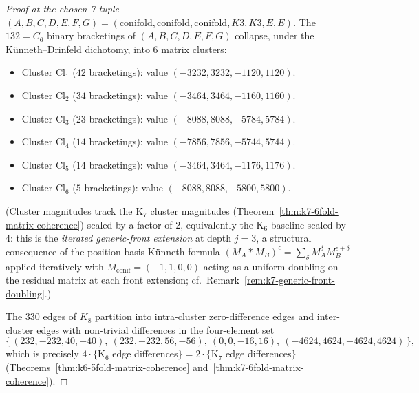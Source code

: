 \begin{proof}[Proof at the chosen 7-tuple
 $(A, B, C, D, E, F, G) = (\mathrm{conifold},
 \mathrm{conifold}, \mathrm{conifold}, K3, K3, E, E)$]
The $132 = C_6$ binary bracketings of $(A, B, C, D, E, F, G)$ collapse,
under the K\"unneth--Drinfeld dichotomy, into $6$ matrix clusters:
\begin{itemize}
\item Cluster $\mathrm{Cl}_1$ \textup{(}$42$ bracketings\textup{):}
 value $(-3232, 3232, -1120, 1120)$.
\item Cluster $\mathrm{Cl}_2$ \textup{(}$34$ bracketings\textup{):}
 value $(-3464, 3464, -1160, 1160)$.
\item Cluster $\mathrm{Cl}_3$ \textup{(}$23$ bracketings\textup{):}
 value $(-8088, 8088, -5784, 5784)$.
\item Cluster $\mathrm{Cl}_4$ \textup{(}$14$ bracketings\textup{):}
 value $(-7856, 7856, -5744, 5744)$.
\item Cluster $\mathrm{Cl}_5$ \textup{(}$14$ bracketings\textup{):}
 value $(-3464, 3464, -1176, 1176)$.
\item Cluster $\mathrm{Cl}_6$ \textup{(}$5$ bracketings\textup{):}
 value $(-8088, 8088, -5800, 5800)$.
\end{itemize}
\textup{(}Cluster magnitudes track the K$_7$ cluster magnitudes
\textup{(}Theorem~\ref{thm:k7-6fold-matrix-coherence}\textup{)} scaled
by a factor of $2$, equivalently the K$_6$ baseline scaled by $4$:
this is the \emph{iterated generic-front extension} at depth $j = 3$,
a structural consequence of the position-basis K\"unneth formula
$(M_A \mathbin{\ast} M_B)^\epsilon = \sum_\delta M_A^\delta M_B^{\epsilon + \delta}$
applied iteratively with $M_{\mathrm{conif}} = (-1, 1, 0, 0)$ acting as
a uniform doubling on the residual matrix at each front extension; cf.\
Remark~\ref{rem:k7-generic-front-doubling}.\textup{)}

The $330$ edges of $K_8$ partition into intra-cluster zero-difference
edges and inter-cluster edges with non-trivial differences in the
four-element set
\[
 \bigl\{\,(232, -232, 40, -40),\ (232, -232, 56, -56),\ (0, 0, -16, 16),\
 (-4624, 4624, -4624, 4624)\,\bigr\},
\]
which is precisely $4 \cdot \{$K$_6$ edge differences$\} = 2 \cdot
\{$K$_7$ edge differences$\}$ \textup{(}Theorems~\ref{thm:k6-5fold-matrix-coherence}
and~\ref{thm:k7-6fold-matrix-coherence}\textup{).}


\end{proof}
